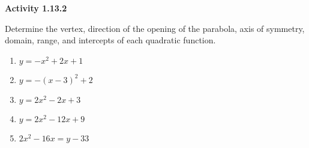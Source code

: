 \noindent\textbf{Activity 1.13.2}


Determine the vertex, direction of the opening of the parabola, axis of symmetry, domain, range, and intercepts of each quadratic function. 
\begin{multicols}{2}
\begin{enumerate}[label = \color{blue}\arabic*. ]
\item $ y = -x^{2} + 2x + 1 $
\item $ y = -(x-3)^{2} + 2 $
\item $ y = 2x^{2} - 2x + 3 $
\item $ y = 2x^{2} - 12x + 9 $
\item $ 2x^{2} - 16x = y - 33 $
\end{enumerate}
\end{multicols} 
